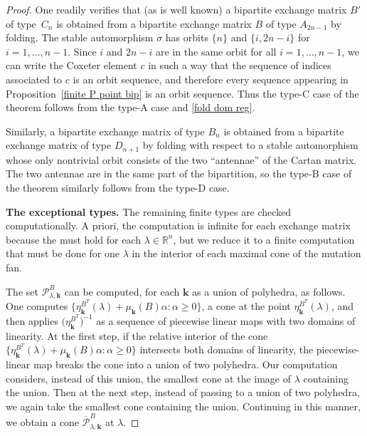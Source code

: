 \documentclass{amsart}
\theoremstyle{definition}
\theoremstyle{remark}
\numberwithin{equation}{section}
\newcommand{\reals}{\mathbb R}
\newcommand{\set}[1]{{\lbrace #1 \rbrace}}
\newcommand{\sett}[1]{{\bigl\lbrace #1 \bigr\rbrace}}
\newcommand{\0}{{\mathbf{0}}}
\newcommand{\kk}{{\boldsymbol{k}}}
\renewcommand{\P}{\mathcal{P}}
\begin{document}
\begin{proof}
One readily verifies that (as is well known) a bipartite exchange matrix $B'$ of type~$C_n$ is obtained from a bipartite exchange matrix $B$ of type $A_{2n-1}$ by folding.
The stable automorphism $\sigma$ has orbits $\set{n}$ and $\set{i,2n-i}$ for $i=1,\ldots,n-1$.
Since $i$ and $2n-i$ are in the same orbit for all $i=1,\ldots,n-1$, we can write the Coxeter element $c$ in such a way that the sequence of indices associated to $c$ is an orbit sequence, and therefore every sequence appearing in Proposition~\ref{finite P point bip} is an orbit sequence.
Thus the type-C case of the theorem follows from the type-A case and \cref{fold dom reg}.

Similarly, a bipartite exchange matrix of type $B_n$ is obtained from a bipartite exchange matrix of type $D_{n+1}$ by folding with respect to a stable automorphism whose only nontrivial orbit consists of the two ``antennae'' of the Cartan matrix.
The two antennae are in the same part of the bipartition, so the type-B case of the theorem similarly follows from the type-D case.

\medskip

\noindent
\textbf{The exceptional types.}
The remaining finite types are checked computationally.
A priori, the computation is infinite for each exchange matrix because the  must hold for each $\lambda\in\reals^n$, but we reduce it to a finite computation that must be done for one $\lambda$ in the interior of each maximal cone of the mutation fan.

The set $\P^B_{\lambda,\kk}$ can be computed, for each $\kk$ as a union of polyhedra, as follows.
One computes $\sett{\eta_\kk^{B^T}(\lambda)+\mu_\kk(B)\alpha:\alpha\ge0}$, a cone at the point $\eta_\kk^{B^T}(\lambda)$, and then applies $\bigl(\eta_{\kk}^{B^T}\bigr)^{-1}$ as a sequence of piecewise linear maps with two domains of linearity.
At the first step, if the relative interior of the cone $\sett{\eta_\kk^{B^T}(\lambda)+\mu_\kk(B)\alpha:\alpha\ge0}$ intersects both domains of linearity, the piecewise-linear map breaks the cone into a union of two polyhedra.
Our computation considers, instead of this union, the smallest cone at the image of $\lambda$ containing the union.
Then at the next step, instead of passing to a union of two polyhedra, we again take the smallest cone containing the union.  
Continuing in this manner, we obtain a cone $\overline{\P}^B_{\lambda,\kk}$ at $\lambda$.


\end{proof}
\end{document}

